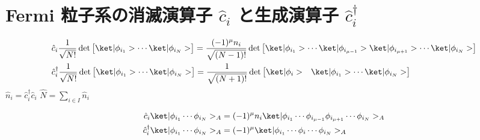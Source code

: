 \documentclass[uplatex,dvipdfmx,a4paper,11pt]{jlreq}
\DeclareMathOperator{\Det}{det}
\numberwithin{equation}{section}
\theoremstyle{definition}
\begin{document}
\section{Fermi 粒子系の消滅演算子 $\hat{c}_i$ と生成演算子 $\hat{c}_i^\dagger$}
\begin{definition}
  \begin{align}
     & \hat{c}_i\frac{1}{\sqrt{N!}}\Det\begin{bmatrix}\ket|\phi_{i_1}> \cdots \ket|\phi_{i_N}>\end{bmatrix} = \frac{(-1)^\mu n_i}{\sqrt{(N-1)!}}\Det\begin{bmatrix}\ket|\phi_{i_1}> \cdots \ket|\phi_{i_{\mu-1}}>\ket|\phi_{i_{\mu+1}}>\cdots\ket|\phi_{i_N}>\end{bmatrix} \\
     & \hat{c}_i^\dagger\frac{1}{\sqrt{N!}}\Det\begin{bmatrix}\ket|\phi_{i_1}> \cdots \ket|\phi_{i_N}>\end{bmatrix} = \frac{1}{\sqrt{(N+1)!}}\Det\begin{bmatrix}\ket|\phi_i> & \ket|\phi_{i_1}> \cdots \ket|\phi_{i_N}>\end{bmatrix}
  \end{align}
  $\hat{n}_i = \hat{c}_i^\dagger\hat{c}_i$
  $\hat{N} = \sum_{i\in I}\hat{n}_i$
\end{definition}
\begin{theorem}
  \begin{align}
    \hat{c}_i\ket|\phi_{i_1}\cdots\phi_{i_N}>_A         & = (-1)^\mu n_i\ket|\phi_{i_1}\cdots\phi_{i_{\mu-1}}\phi_{i_{\mu+1}}\cdots\phi_{i_N}>_A \\
    \hat{c}_i^\dagger\ket|\phi_{i_1}\cdots\phi_{i_N}>_A & = (-1)^\mu\ket|\phi_{i_1}\cdots\phi_i\cdots\phi_{i_N}>_A
  \end{align}
\end{theorem}
\end{document}
